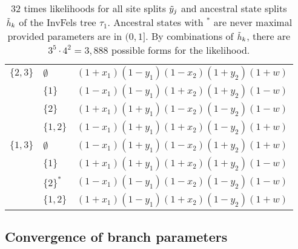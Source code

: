 \begin{table}
\begin{tabular}{|l|ll|}
$\{2,3\}$  &$\emptyset$&$(1+x_1)(1-y_1)(1-x_2)(1+y_2)(1+w)$\\
&$\{1\}$&$(1-x_1)(1-y_1)(1+x_2)(1+y_2)(1-w)$               \\
&$\{2\}$&$(1+x_1)(1+y_1)(1-x_2)(1-y_2)(1-w)$               \\
&$\{1,2\}$&$(1-x_1)(1+y_1)(1+x_2)(1-y_2)(1+w)$             \\

$\{1,3\}$  &$\emptyset$&$(1-x_1)(1+y_1)(1-x_2)(1+y_2)(1+w)$\\
&$\{1\}$&$(1+x_1)(1+y_1)(1+x_2)(1+y_2)(1-w)$               \\
&$\{2\}^*$&$(1-x_1)(1-y_1)(1-x_2)(1-y_2)(1-w)$             \\
&$\{1,2\}$&$(1+x_1)(1-y_1)(1+x_2)(1-y_2)(1+w)$             \\
\hline
\end{tabular}
\caption{
32 times likelihoods for all site splits $\tilde{y}_j$ and ancestral state splits $\tilde{h}_k$ of the InvFels tree $\tau_1$.
Ancestral states with $^*$ are never maximal provided parameters are in $(0,1]$.
By combinations of $\tilde{h}_k$, there are $3^5\cdot 4^2=3,888$ possible forms for the likelihood.
}
\label{tab:farris_likelihoods}
\end{table}


\subsection*{Convergence of branch parameters}


